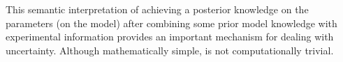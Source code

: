This semantic interpretation of achieving a posterior knowledge on the parameters (on the model)
after combining some prior model knowledge with experimental information provides an important mechanism for dealing with uncertainty.
Although mathematically simple, is not computationally trivial. 



% 
% 

